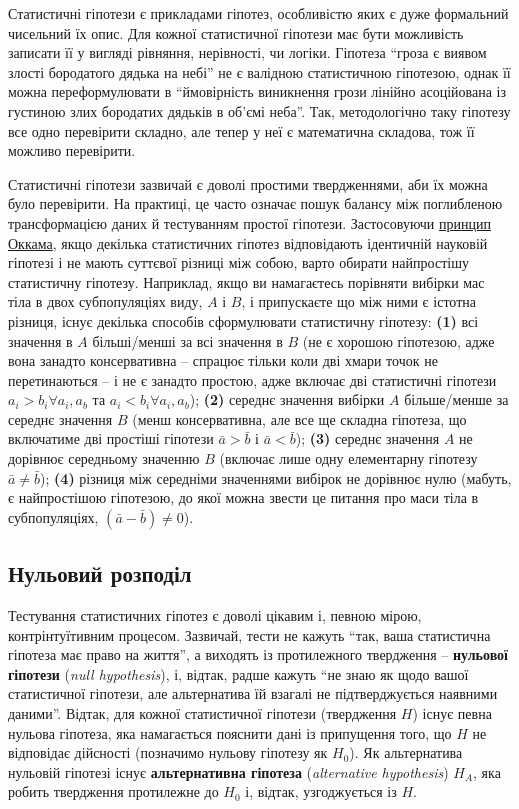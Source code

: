 \documentclass[
  11pt,
]{book}
\begin{document}
Статистичні гіпотези є прикладами гіпотез, особливістю яких є дуже формальний чисельний їх опис. Для кожної статистичної гіпотези має бути можливість записати її у вигляді рівняння, нерівності, чи логіки. Гіпотеза ``гроза є виявом злості бородатого дядька на небі'' не є валідною статистичною гіпотезою, однак її можна переформулювати в ``ймовірність виникнення грози лінійно асоційована із густиною злих бородатих дядьків в об'ємі неба''. Так, методологічно таку гіпотезу все одно перевірити складно, але тепер у неї є математична складова, тож її можливо перевірити.

Статистичні гіпотези зазвичай є доволі простими твердженнями, аби їх можна було перевірити. На практиці, це часто означає пошук балансу між поглибленою трансформацією даних й тестуванням простої гіпотези. Застосовуючи \href{https://uk.wikipedia.org/wiki/\%D0\%91\%D1\%80\%D0\%B8\%D1\%82\%D0\%B2\%D0\%B0_\%D0\%9E\%D0\%BA\%D0\%BA\%D0\%B0\%D0\%BC\%D0\%B0}{принцип Оккама}, якщо декілька статистичних гіпотез відповідають ідентичній науковій гіпотезі і не мають суттєвої різниці між собою, варто обирати найпростішу статистичну гіпотезу. Наприклад, якщо ви намагаєтесь порівняти вибірки мас тіла в двох субпопуляціях виду, \(A\) і \(B\), і припускаєте що між ними є істотна різниця, існує декілька способів сформулювати статистичну гіпотезу: \textbf{(1)} всі значення в \(A\) більші/менші за всі значення в \(B\) (не є хорошою гіпотезою, адже вона занадто консервативна -- спрацює тільки коли дві хмари точок не перетинаються -- і не є занадто простою, адже включає дві статистичні гіпотези \(a_i > b_i \forall a_i, a_b\) та \(a_i < b_i \forall a_i, a_b\)); \textbf{(2)} середнє значення вибірки \(A\) більше/менше за середнє значення \(B\) (менш консервативна, але все ще складна гіпотеза, що включатиме дві простіші гіпотези \(\bar{a} > \bar{b}\) і \(\bar{a} < \bar{b}\)); \textbf{(3)} середнє значення \(A\) не дорівнює середньому значенню \(B\) (включає лише одну елементарну гіпотезу \(\bar{a} \neq \bar{b}\)); \textbf{(4)} різниця між середніми значеннями вибірок не дорівнює нулю (мабуть, є найпростішою гіпотезою, до якої можна звести це питання про маси тіла в субпопуляціях, \((\bar{a} - \bar{b}) \neq 0\)).

\subsection{Нульовий розподіл}\label{nulldistr}

Тестування статистичних гіпотез є доволі цікавим і, певною мірою, контрінтуїтивним процесом. Зазвичай, тести не кажуть ``так, ваша статистична гіпотеза має право на життя'', а виходять із протилежного твердження -- \textbf{нульової гіпотези} (\emph{null hypothesis}), і, відтак, радше кажуть ``не знаю як щодо вашої статистичної гіпотези, але альтернатива їй взагалі не підтверджується наявними даними''. Відтак, для кожної статистичної гіпотези (твердження \(H\)) існує певна нульова гіпотеза, яка намагається пояснити дані із припущення того, що \(H\) не відповідає дійсності (позначимо нульову гіпотезу як \(H_0\)). Як альтернатива нульовій гіпотезі існує \textbf{альтернативна гіпотеза} (\emph{alternative hypothesis}) \(H_A\), яка робить твердження протилежне до \(H_0\) і, відтак, узгоджується із \(H\).
\end{document}

